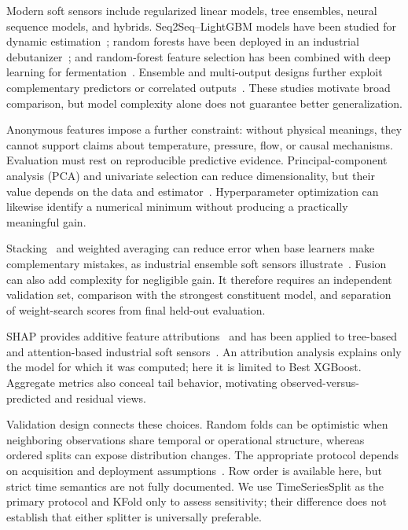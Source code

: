 \documentclass[sigconf,screen,review,anonymous]{acmart}
\begin{document}
Modern soft sensors include regularized linear models, tree ensembles, neural sequence models, and hybrids. Seq2Seq--LightGBM models have been studied for dynamic estimation~\cite{li2020seq2seq_lightgbm}; random forests have been deployed in an industrial debutanizer~\cite{botha2021industrial_softsensor}; and random-forest feature selection has been combined with deep learning for fermentation~\cite{hua2023rf_feature_selection}. Ensemble and multi-output designs further exploit complementary predictors or correlated outputs~\cite{wang2019two_layer_ensemble,pan2019ensemble_jit,wan2024wide_rf}. These studies motivate broad comparison, but model complexity alone does not guarantee better generalization.

Anonymous features impose a further constraint: without physical meanings, they cannot support claims about temperature, pressure, flow, or causal mechanisms. Evaluation must rest on reproducible predictive evidence. Principal-component analysis (PCA) and univariate selection can reduce dimensionality, but their value depends on the data and estimator~\cite{jolliffe2016pca,guyon2003feature_selection}. Hyperparameter optimization can likewise identify a numerical minimum without producing a practically meaningful gain.

Stacking~\cite{wolpert1992stacking} and weighted averaging can reduce error when base learners make complementary mistakes, as industrial ensemble soft sensors illustrate~\cite{wang2019two_layer_ensemble,pan2019ensemble_jit}. Fusion can also add complexity for negligible gain. It therefore requires an independent validation set, comparison with the strongest constituent model, and separation of weight-search scores from final held-out evaluation.

SHAP provides additive feature attributions~\cite{lundberg2017shap} and has been applied to tree-based and attention-based industrial soft sensors~\cite{cao2023interpretable_softsensor,cao2024informer_shap}. An attribution analysis explains only the model for which it was computed; here it is limited to Best XGBoost. Aggregate metrics also conceal tail behavior, motivating observed-versus-predicted and residual views.

Validation design connects these choices. Random folds can be optimistic when neighboring observations share temporal or operational structure, whereas ordered splits can expose distribution changes. The appropriate protocol depends on acquisition and deployment assumptions~\cite{bergmeir2012cv,bergmeir2018cv}. Row order is available here, but strict time semantics are not fully documented. We use TimeSeriesSplit as the primary protocol and KFold only to assess sensitivity; their difference does not establish that either splitter is universally preferable.
\end{document}
